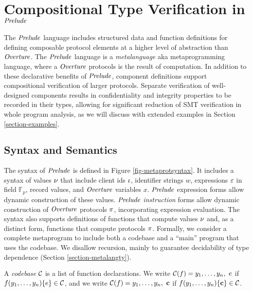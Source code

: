 \section{Compositional Type Verification in $\mathit{Prelude}$}
\label{section-metalang}

The $\mathit{Prelude}$ language \cite{skalka-near-ppdp24} includes structured
data and function definitions for defining composable protocol
elements at a higher level of abstraction than $\mathit{Overture}$.  The
$\mathit{Prelude}$ language is a \emph{metalanguage} aka metaprogramming
language, where a $\mathit{Overture}$ protocols is the result of
computation. In addition to these declarative benefits of $\mathit{Prelude}$,
component definitions support compositional verification of larger
protocols. Separate verification of well-designed components results
in confidentiality and integrity properties to be recorded in their
types, allowing for significant reduction of SMT verification in whole
program analysis, as we will discuss with extended examples in Section
\ref{section-examples}.

\metaprotsyntaxfig

\subsection{Syntax and Semantics}

The syntax of $\mathit{Prelude}$ is defined in Figure
\ref{fig-metaprotsyntax}.  It includes a syntax of values $\nu$ that
include client ids $\iota$, identifier strings $w$, expressions $\varepsilon$
in field $\mathbb{F}_p$, record values, and $\mathit{Overture}$ variables
$x$. $\mathit{Prelude}$ expression forms allow dynamic construction of these
values. $\mathit{Prelude}$ \emph{instruction} forms allow dynamic
construction of $\mathit{Overture}$ protocols $\pi$, incorporating expression
evaluation. The syntax also supports definitions of functions that
compute values $\nu$ and, as a distinct form, functions that compute
protocols $\pi$.  Formally, we consider a complete metaprogram to include
both a codebase and a ``main'' program that uses the codebase.
We disallow recursion, mainly to guarantee decidability
of type dependence (Section \ref{section-metalangty}).
\begin{definition}
A \emph{codebase} $\mathcal{C}$ is a list of function 
declarations. We write $ \mathcal{C}(f) = y_1,\ldots,y_n,\ e$
if $f(y_1,\ldots,y_n) \{ e \} \in \mathcal{C}$, and we
write  $ \codebase(f) = y_1,\ldots,y_n,\ \instr$
if $f(y_1,\ldots,y_n) \{ \mathbf{c} \} \in \mathcal{C}$.
\end{definition}

